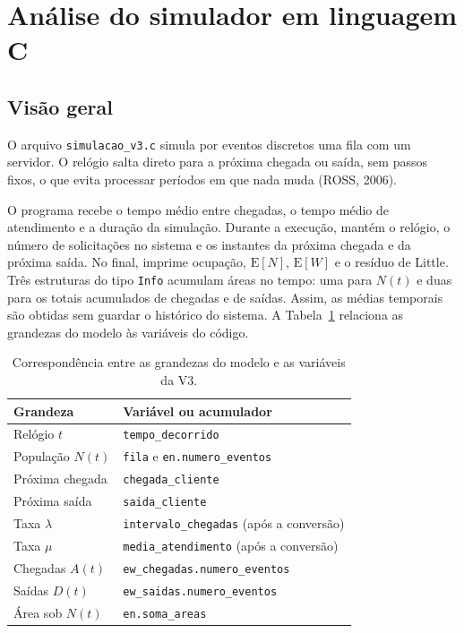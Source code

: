 \documentclass[
  article,      %
  10pt,         %
  oneside,
  a4paper,
  twocolumn,    %
  english,
  brazil        %
]{abntex2}
\newcommand{\EN}{\mathrm{E}[N]}
\newcommand{\EW}{\mathrm{E}[W]}
\begin{document}

\section{Análise do simulador em linguagem C}

\subsection{Visão geral}

O arquivo \texttt{simulacao\_v3.c} simula por eventos discretos uma fila com um servidor. O relógio salta direto para a próxima chegada ou saída, sem passos fixos, o que evita processar períodos em que nada muda (ROSS, 2006).

O programa recebe o tempo médio entre chegadas, o tempo médio de atendimento e a duração da simulação. Durante a execução, mantém o relógio, o número de solicitações no sistema e os instantes da próxima chegada e da próxima saída. No final, imprime ocupação, $\EN$, $\EW$ e o resíduo de Little. Três estruturas do tipo \texttt{Info} acumulam áreas no tempo: uma para $N(t)$ e duas para os totais acumulados de chegadas e de saídas. Assim, as médias temporais são obtidas sem guardar o histórico do sistema. A Tabela~\ref{tab:mapeamento} relaciona as grandezas do modelo às variáveis do código.

\begin{table}[htbp]
  \centering
  \caption{Correspondência entre as grandezas do modelo e as variáveis da V3.}
  \label{tab:mapeamento}
  \small
  \begin{tabularx}{\linewidth}{@{}lX@{}}
    \toprule
    Grandeza & Variável ou acumulador \\
    \midrule
    Relógio $t$ & \texttt{tempo\_decorrido} \\
    População $N(t)$ & \texttt{fila} e \texttt{en.numero\_eventos} \\
    Próxima chegada & \texttt{chegada\_cliente} \\
    Próxima saída & \texttt{saida\_cliente} \\
    Taxa $\lambda$ & \texttt{intervalo\_chegadas} (após a conversão) \\
    Taxa $\mu$ & \texttt{media\_atendimento} (após a conversão) \\
    Chegadas $A(t)$ & \texttt{ew\_chegadas.numero\_eventos} \\
    Saídas $D(t)$ & \texttt{ew\_saidas.numero\_eventos} \\
    Área sob $N(t)$ & \texttt{en.soma\_areas} \\
    \bottomrule
  \end{tabularx}
\end{table}
\end{document}
